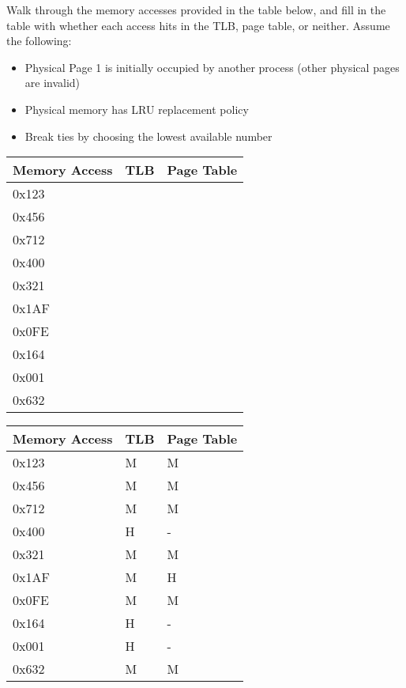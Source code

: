 \begin{blocksection}
\question 
Walk through the memory accesses provided in the table below, and fill in the table with whether each access hits in the TLB, page table, or neither. Assume the following:
\begin{itemize}
\item Physical Page 1 is initially occupied by another process (other physical pages are invalid)
\item Physical memory has LRU replacement policy
\item Break ties by choosing the lowest available number
\end{itemize}

\begin{tabular}{ |l|l|l| } 
 \hline
 Memory Access & TLB & Page Table \\ 
 \hline
 0x123 & & \\
 \hline
 0x456 & & \\
 \hline
 0x712 & & \\
 \hline 
 0x400 & & \\
 \hline
 0x321 & & \\
 \hline
 0x1AF & & \\
 \hline
 0x0FE & & \\
 \hline
 0x164 & & \\
 \hline
 0x001 & & \\
 \hline
 0x632 & & \\
 \hline
\end{tabular}

\begin{solution}
\begin{tabular}{ |l|l|l| } 
 \hline
 Memory Access & TLB & Page Table \\ 
 \hline
 0x123 & M & M \\
 \hline 
 0x456 & M & M \\
 \hline
 0x712 & M & M \\
 \hline 
 0x400 & H & - \\
 \hline
 0x321 & M & M \\
 \hline
 0x1AF & M & H \\
 \hline
 0x0FE & M & M \\
 \hline
 0x164 & H & - \\
 \hline
 0x001 & H & - \\
 \hline
 0x632 & M & M \\
 \hline
\end{tabular}
\end{solution}

\end{blocksection}